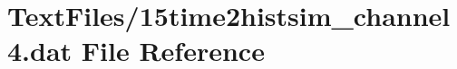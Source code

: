 \hypertarget{15time2histsim__channel4_8dat}{}\section{Text\+Files/15time2histsim\+\_\+channel4.dat File Reference}
\label{15time2histsim__channel4_8dat}
